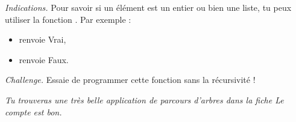 \documentclass[11pt,class=report,crop=false]{standalone}
\begin{document}
\begin{activite}
\begin{enumerate}
\begin{itemize}
  \end{itemize}
  
  \bigskip
  
  \emph{Indications.} Pour savoir si un élément est un entier ou bien une liste, tu peux utiliser la fonction . Par exemple :
  \begin{itemize}
    \item {} renvoie \og{}Vrai\fg{},
    \item {} renvoie \og{}Faux\fg{}.
  \end{itemize}

  \bigskip
    
  \emph{Challenge.} Essaie de programmer cette fonction sans la récursivité ! 
  

  
\end{enumerate}


\emph{Tu trouveras une très belle application de parcours d'arbres dans la fiche \og{}Le compte est bon\fg{}.}
 
\end{activite}



\end{document}
